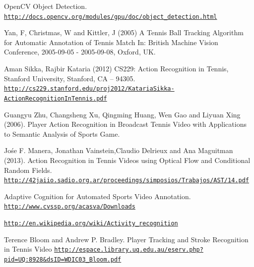 \documentclass[10.5pt]{proc}
\begin{document}
\begin{thebibliography}{99}

OpenCV Object Detection. \\
\href{http://docs.opencv.org/modules/gpu/doc/object\_detection.html}{\texttt{http://docs.opencv.org/modules/gpu/doc/object\_detection.html}}

Yan, F, Christmas, W and Kittler, J (2005) A Tennis Ball Tracking Algorithm for Automatic Annotation of Tennis Match In: British Machine Vision Conference, 2005-09-05 - 2005-09-08, Oxford, UK.

Aman Sikka, Rajbir Kataria (2012) CS229: Action Recognition in Tennis, Stanford University, Stanford, CA -- 94305.\\
\href{http://cs229.stanford.edu/proj2012/KatariaSikka-ActionRecognitionInTennis.pdf}{\texttt{http://cs229.stanford.edu/proj2012/KatariaSikka-ActionRecognitionInTennis.pdf}}

Guangyu Zhu, Changsheng Xu, Qingming Huang, Wen Gao and Liyuan Xing (2006). Player Action Recognition in Broadcast Tennis Video with Applications to Semantic Analysis of Sports Game. 

Jo\'se F. Manera, Jonathan Vainstein,Claudio Delrieux and Ana Maguitman (2013). Action Recognition in Tennis Videos using Optical Flow and Conditional Random Fields.
\href{http://42jaiio.sadio.org.ar/proceedings/simposios/Trabajos/AST/14.pdf}{\texttt{http://42jaiio.sadio.org.ar/proceedings/simposios/Trabajos/AST/14.pdf}}

Adaptive Cognition  for Automated Sports Video Annotation.\\
\href{http://www.cvssp.org/acasva/Downloads}{\texttt{http://www.cvssp.org/acasva/Downloads}}

\bibitem{}
\href{http://en.wikipedia.org/wiki/Activity\_recognition}{\texttt{http://en.wikipedia.org/wiki/Activity\_recognition}}

\bibitem{}
Terence Bloom and Andrew P. Bradley. Player Tracking and Stroke Recognition in Tennis Video
\href{{http://espace.library.uq.edu.au/eserv.php?pid=UQ:8928\&dsID=WDIC03\_Bloom.pdf}}{\texttt{http://espace.library.uq.edu.au/eserv.php?pid=UQ:8928\&dsID=WDIC03\_Bloom.pdf}}

\end{thebibliography}
\end{document}

